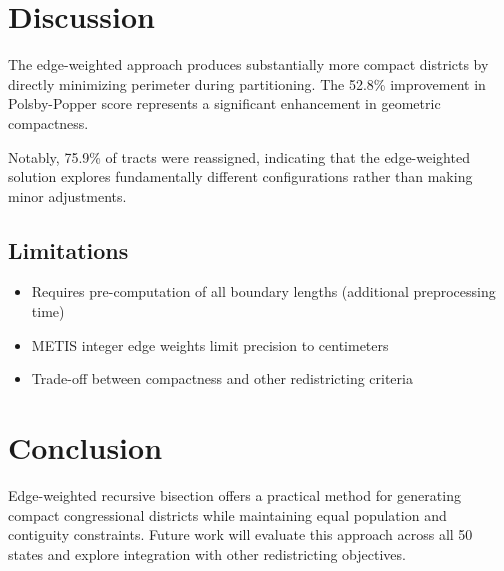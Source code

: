 \documentclass[11pt]{article}
\begin{document}

\section{Discussion}

The edge-weighted approach produces substantially more compact districts by directly minimizing perimeter during partitioning. The 52.8\% improvement in Polsby-Popper score represents a significant enhancement in geometric compactness.

Notably, 75.9\% of tracts were reassigned, indicating that the edge-weighted solution explores fundamentally different configurations rather than making minor adjustments.

\subsection{Limitations}

\begin{itemize}
\item Requires pre-computation of all boundary lengths (additional preprocessing time)
\item METIS integer edge weights limit precision to centimeters
\item Trade-off between compactness and other redistricting criteria
\end{itemize}

\section{Conclusion}

Edge-weighted recursive bisection offers a practical method for generating compact congressional districts while maintaining equal population and contiguity constraints. Future work will evaluate this approach across all 50 states and explore integration with other redistricting objectives.



\end{document}
